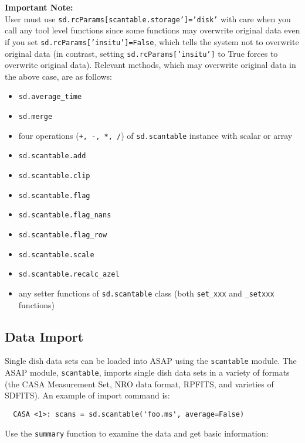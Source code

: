 {\bf Important Note:}\\
User must use {\tt sd.rcParams[scantable.storage']='disk'} with care when 
you call any tool level functions since some functions may overwrite original data 
even if you set {\tt sd.rcParams['insitu']=False}, which tells the system not to 
overwrite original data (in contrast, setting {\tt sd.rcParams['insitu']} to True 
forces to overwrite original data). 
Relevant methods, which may overwrite original data in the above case, are as follows:
\small
\begin{itemize}
   \item {\tt sd.average\_time}
   \item {\tt sd.merge}
   \item four operations ({\tt +, -, *, /}) of {\tt sd.scantable} instance with scalar or array
   \item {\tt sd.scantable.add}
   \item {\tt sd.scantable.clip}
   \item {\tt sd.scantable.flag}
   \item {\tt sd.scantable.flag\_nans}
   \item {\tt sd.scantable.flag\_row}
   \item {\tt sd.scantable.scale}
   \item {\tt sd.scantable.recalc\_azel}
   \item any setter functions of {\tt sd.scantable} class (both {\tt set\_xxx} and {\tt \_setxxx} functions)
\end{itemize}
\normalsize


\subsection{Data Import}
\label{subsection:sd.asap.import}

Single dish data sets can be loaded into ASAP using the {\tt scantable}
module. The ASAP module, {\tt scantable}, imports single dish data sets in
a variety of formats (the CASA Measurement Set, NRO data format, RPFITS,
and varieties of SDFITS). An example of import command is:

\small
\begin{verbatim}
  CASA <1>: scans = sd.scantable('foo.ms', average=False)
\end{verbatim}
\normalsize

Use the {\tt summary} function to examine the data and get basic information:

